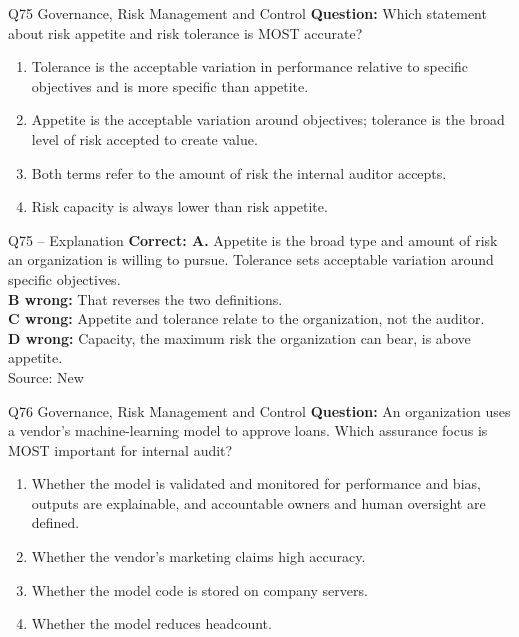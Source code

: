 \documentclass[aspectratio=169,10pt]{beamer}
\begin{document}
\begin{frame}[t]{Q75 \hfill {\scriptsize Governance, Risk Management and Control}}
	\small
	\textbf{Question:} Which statement about risk appetite and risk tolerance is MOST accurate?
	\begin{enumerate}[label=\Alph*.,itemsep=1pt,topsep=3pt]
			\item Tolerance is the acceptable variation in performance relative to specific objectives and is more specific than appetite.
			\item Appetite is the acceptable variation around objectives; tolerance is the broad level of risk accepted to create value.
			\item Both terms refer to the amount of risk the internal auditor accepts.
			\item Risk capacity is always lower than risk appetite.
	\end{enumerate}
\end{frame}

\begin{frame}[t]{Q75 -- Explanation}
	\footnotesize
	\textbf{Correct: A.} Appetite is the broad type and amount of risk an organization is willing to pursue. Tolerance sets acceptable variation around specific objectives. \\[5pt]
\textbf{B wrong:} That reverses the two definitions. \\[3pt]
\textbf{C wrong:} Appetite and tolerance relate to the organization, not the auditor. \\[3pt]
\textbf{D wrong:} Capacity, the maximum risk the organization can bear, is above appetite. \\[3pt]
	\vfill {\tiny Source: New}
\end{frame}

\begin{frame}[t]{Q76 \hfill {\scriptsize Governance, Risk Management and Control}}
	\small
	\textbf{Question:} An organization uses a vendor's machine-learning model to approve loans. Which assurance focus is MOST important for internal audit?
	\begin{enumerate}[label=\Alph*.,itemsep=1pt,topsep=3pt]
			\item Whether the model is validated and monitored for performance and bias, outputs are explainable, and accountable owners and human oversight are defined.
			\item Whether the vendor's marketing claims high accuracy.
			\item Whether the model code is stored on company servers.
			\item Whether the model reduces headcount.
	\end{enumerate}
\end{frame}
\end{document}
